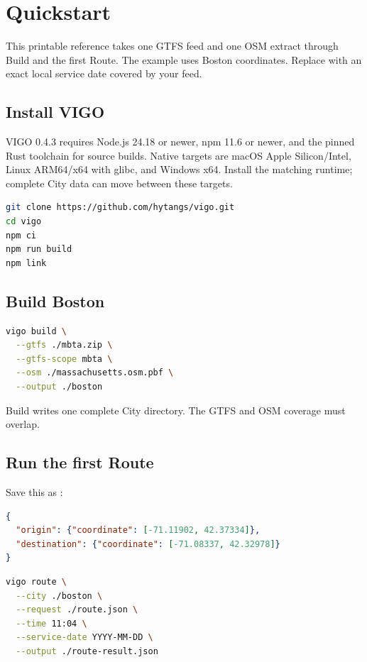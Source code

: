 \documentclass[10pt,letterpaper]{article}
\begin{document}
\guideheader

\section{Quickstart}

This printable reference takes one GTFS feed and one OSM extract through Build and the first Route. The example uses Boston coordinates. Replace  with an exact local service date covered by your feed.

\subsection{Install VIGO}

VIGO 0.4.3 requires Node.js 24.18 or newer, npm 11.6 or newer, and the pinned Rust toolchain for source builds. Native targets are macOS Apple Silicon/Intel, Linux ARM64/x64 with glibc, and Windows x64. Install the matching runtime; complete City data can move between these targets.

\begin{lstlisting}[language=bash]
git clone https://github.com/hytangs/vigo.git
cd vigo
npm ci
npm run build
npm link
\end{lstlisting}

\subsection{Build Boston}

\begin{lstlisting}[language=bash]
vigo build \
  --gtfs ./mbta.zip \
  --gtfs-scope mbta \
  --osm ./massachusetts.osm.pbf \
  --output ./boston
\end{lstlisting}

Build writes one complete City directory. The GTFS and OSM coverage must overlap.

\subsection{Run the first Route}

Save this as \code{route.json}:

\begin{lstlisting}[language=json]
{
  "origin": {"coordinate": [-71.11902, 42.37334]},
  "destination": {"coordinate": [-71.08337, 42.32978]}
}
\end{lstlisting}

\begin{lstlisting}[language=bash]
vigo route \
  --city ./boston \
  --request ./route.json \
  --time 11:04 \
  --service-date YYYY-MM-DD \
  --output ./route-result.json
\end{lstlisting}
\end{document}
